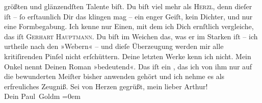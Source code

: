 \begin{ledgroupsized}[t]{13cm}
               größten und glänzendſten Talente biſt. Du biſt viel mehr als \textsc{Herzl}, denn dieſer iſt – ſo erſtaunlich Dir das klingen mag – ein enger Geiſt, kein
               Dichter, und nur eine Formbegabung. Ich kenne nur Einen, mit dem ich Dich ernſtlich
               vergleiche, das iſt \textsc{Gerhart Hauptmann}. Du biſt im Weichen das, was er im Starken iſt – ich urtheile nach den »Webern« – und dieſe Überzeugung werden mir alle
               kritiſirenden Pinſel nicht erſchüttern. Deine letzten Werke kenn ich nicht. Mein Onkel nennt Deinen Roman »bedeutend«. Das iſt ein
                  \label{K_L02711-6v}\label{K_L02711-6h}, das ich von ihm nur auf die bewunderten Meiſter bisher anwenden
               gehört und ich nehme es als erfreuliches Zeugniß.\pend
           \pstart
           Sei von Herzen gegrüßt, mein lieber Arthur!{\\[\baselineskip]}Dein \spacefill\mbox{Paul Goldm}\pend
           \leftskip=0em{}
         
         \endnumbering{}\end{ledgroupsized}  \newcommand{\dateiname}{L02711}\newcommand{\titel}{Paul Goldmann an Arthur Schnitzler, 8. 8. 1893}\newcommand{\editorInnen}{Martin Anton Müller und Laura Untner}
            \footnotesize
\begin{ledgroupsized}[t]{11.5cm}
\end{ledgroupsized}
         
      